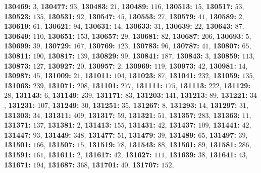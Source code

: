 \textsf{\bfseries 130469:} $3$, \textsf{\bfseries 130477:} $93$, \textsf{\bfseries 130483:} $21$, \textsf{\bfseries 130489:} $116$, \textsf{\bfseries 130513:} $15$, \textsf{\bfseries 130517:} $53$, \textsf{\bfseries 130523:} $135$, \textsf{\bfseries 130531:} $92$, \textsf{\bfseries 130547:} $45$, \textsf{\bfseries 130553:} $27$, \textsf{\bfseries 130579:} $41$, \textsf{\bfseries 130589:} $2$, \textsf{\bfseries 130619:} $61$, \textsf{\bfseries 130621:} $94$, \textsf{\bfseries 130631:} $14$, \textsf{\bfseries 130633:} $31$, \textsf{\bfseries 130639:} $22$, \textsf{\bfseries 130643:} $87$, \textsf{\bfseries 130649:} $110$, \textsf{\bfseries 130651:} $153$, \textsf{\bfseries 130657:} $29$, \textsf{\bfseries 130681:} $82$, \textsf{\bfseries 130687:} $206$, \textsf{\bfseries 130693:} $5$, \textsf{\bfseries 130699:} $39$, \textsf{\bfseries 130729:} $167$, \textsf{\bfseries 130769:} $123$, \textsf{\bfseries 130783:} $96$, \textsf{\bfseries 130787:} $41$, \textsf{\bfseries 130807:} $65$, \textsf{\bfseries 130811:} $190$, \textsf{\bfseries 130817:} $139$, \textsf{\bfseries 130829:} $99$, \textsf{\bfseries 130841:} $187$, \textsf{\bfseries 130843:} $3$, \textsf{\bfseries 130859:} $113$, \textsf{\bfseries 130873:} $127$, \textsf{\bfseries 130927:} $20$, \textsf{\bfseries 130957:} $2$, \textsf{\bfseries 130969:} $119$, \textsf{\bfseries 130973:} $42$, \textsf{\bfseries 130981:} $14$, \textsf{\bfseries 130987:} $45$, \textsf{\bfseries 131009:} $21$, \textsf{\bfseries 131011:} $104$, \textsf{\bfseries 131023:} $87$, \textsf{\bfseries 131041:} $232$, \textsf{\bfseries 131059:} $135$, \textsf{\bfseries 131063:} $239$, \textsf{\bfseries 131071:} $208$, \textsf{\bfseries 131101:} $277$, \textsf{\bfseries 131111:} $175$, \textsf{\bfseries 131113:} $222$, \textsf{\bfseries 131129:} $28$, \textsf{\bfseries 131143:} $6$, \textsf{\bfseries 131149:} $239$, \textsf{\bfseries 131171:} $83$, \textsf{\bfseries 131203:} $141$, \textsf{\bfseries 131213:} $89$, \textsf{\bfseries 131221:} $34$, \textsf{\bfseries 131231:} $107$, \textsf{\bfseries 131249:} $30$, \textsf{\bfseries 131251:} $35$, \textsf{\bfseries 131267:} $8$, \textsf{\bfseries 131293:} $14$, \textsf{\bfseries 131297:} $31$, \textsf{\bfseries 131303:} $34$, \textsf{\bfseries 131311:} $409$, \textsf{\bfseries 131317:} $59$, \textsf{\bfseries 131321:} $51$, \textsf{\bfseries 131357:} $283$, \textsf{\bfseries 131363:} $11$, \textsf{\bfseries 131371:} $137$, \textsf{\bfseries 131381:} $2$, \textsf{\bfseries 131413:} $155$, \textsf{\bfseries 131431:} $42$, \textsf{\bfseries 131437:} $109$, \textsf{\bfseries 131441:} $42$, \textsf{\bfseries 131447:} $93$, \textsf{\bfseries 131449:} $348$, \textsf{\bfseries 131477:} $51$, \textsf{\bfseries 131479:} $39$, \textsf{\bfseries 131489:} $65$, \textsf{\bfseries 131497:} $39$, \textsf{\bfseries 131501:} $166$, \textsf{\bfseries 131507:} $15$, \textsf{\bfseries 131519:} $78$, \textsf{\bfseries 131543:} $88$, \textsf{\bfseries 131561:} $89$, \textsf{\bfseries 131581:} $286$, \textsf{\bfseries 131591:} $161$, \textsf{\bfseries 131611:} $2$, \textsf{\bfseries 131617:} $42$, \textsf{\bfseries 131627:} $111$, \textsf{\bfseries 131639:} $38$, \textsf{\bfseries 131641:} $43$, \textsf{\bfseries 131671:} $194$, \textsf{\bfseries 131687:} $368$, \textsf{\bfseries 131701:} $40$, \textsf{\bfseries 131707:} $152$, 
